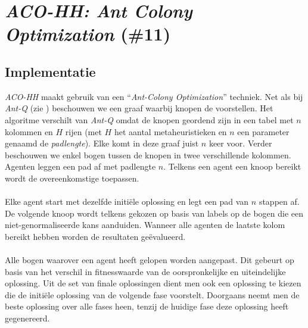 \section{\emph{ACO-HH: Ant Colony Optimization} (\#11)}

\subsection{Implementatie}
\emph{ACO-HH}\cite{chesc-aco-hh} maakt gebruik van een ``\emph{Ant-Colony Optimization}''\cite{hom/aco} techniek. Net als bij \emph{Ant-Q} (zie ) beschouwen we een graaf waarbij knopen de \abllhn{} voorstellen. Het algoritme verschilt van \emph{Ant-Q} omdat de knopen geordend zijn in een tabel met $n$ kolommen en $H$ rijen (met $H$ het aantal metaheuristieken en $n$ een parameter genaamd de \emph{padlengte}). Elke \abllh{} komt in deze graaf juist $n$ keer voor. Verder beschouwen we enkel bogen tussen de knopen in twee verschillende kolommen. Agenten leggen een pad af met padlengte $n$. Telkens een agent een knoop bereikt wordt de overeenkomstige \abllh{} toepassen.

\paragraph{}
Elke agent start met dezelfde initi\"ele oplossing en legt een pad van $n$ stappen af. De volgende knoop wordt telkens gekozen op basis van labels op de bogen die een niet-genormaliseerde kans aanduiden. Wanneer alle agenten de laatste kolom bereikt hebben worden de resultaten ge\"evalueerd.

\paragraph{}
Alle bogen waarover een agent heeft gelopen worden aangepast. Dit gebeurt op basis van het verschil in fitnesswaarde van de oorspronkelijke en uiteindelijke oplossing. Uit de set van finale oplossingen dient men ook een oplossing te kiezen die de initi\"ele oplossing van de volgende fase voorstelt. Doorgaans neemt men de beste oplossing over alle fases heen, tenzij de huidige fase deze oplossing heeft gegenereerd.

